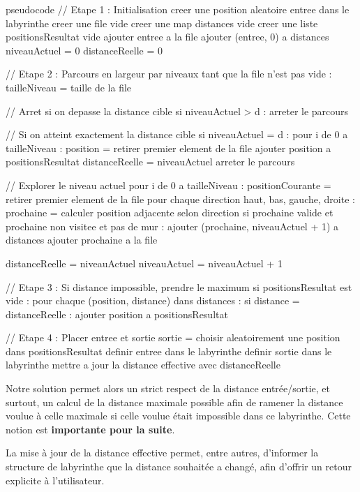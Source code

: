 \documentclass{butexFR}
\begin{document}
\begin{codeboxlang}{pseudocode}
// Etape 1 : Initialisation
creer une position aleatoire entree dans le labyrinthe
creer une file vide
creer une map distances vide
creer une liste positionsResultat vide
ajouter entree a la file
ajouter (entree, 0) a distances
niveauActuel = 0
distanceReelle = 0

// Etape 2 : Parcours en largeur par niveaux
tant que la file n'est pas vide :
    tailleNiveau = taille de la file

    // Arret si on depasse la distance cible
    si niveauActuel > d :
        arreter le parcours

    // Si on atteint exactement la distance cible
    si niveauActuel = d :
        pour i de 0 a tailleNiveau :
            position = retirer premier element de la file
            ajouter position a positionsResultat
            distanceReelle = niveauActuel
            arreter le parcours

    // Explorer le niveau actuel
    pour i de 0 a tailleNiveau :
        positionCourante = retirer premier element de la file
        pour chaque direction {haut, bas, gauche, droite} :
            prochaine = calculer position adjacente selon direction
            si prochaine valide et prochaine non visitee et pas de mur :
                ajouter (prochaine, niveauActuel + 1) a distances
                ajouter prochaine a la file

    distanceReelle = niveauActuel
    niveauActuel = niveauActuel + 1

// Etape 3 : Si distance impossible, prendre le maximum
si positionsResultat est vide :
    pour chaque (position, distance) dans distances :
        si distance = distanceReelle :
            ajouter position a positionsResultat

// Etape 4 : Placer entree et sortie
sortie = choisir aleatoirement une position dans positionsResultat
definir entree dans le labyrinthe
definir sortie dans le labyrinthe
mettre a jour la distance effective avec distanceReelle
\end{codeboxlang}

Notre solution permet alors un strict respect de la distance entrée/sortie, et surtout, un calcul de la distance maximale possible afin de ramener la distance voulue à celle maximale si celle voulue était impossible dans ce labyrinthe. Cette notion est \textbf{importante pour la suite}.

La mise à jour de la distance effective permet, entre autres, d’informer la structure de labyrinthe que la distance souhaitée a changé, afin d’offrir un retour explicite à l’utilisateur.
\end{document}
